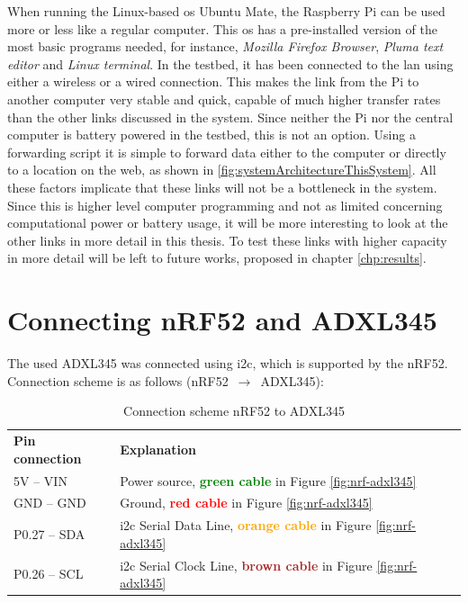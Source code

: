 \noindent When running the Linux-based \gls{os} Ubuntu Mate, the \gls{Raspberry Pi} can be used more or less like a regular computer. This \gls{os} has a pre-installed version of the most basic programs needed, for instance, \textit{Mozilla Firefox Browser}, \textit{Pluma text editor} and \textit{Linux terminal}. In the testbed, it has been connected to the \gls{lan} using either a wireless or a wired connection. This makes the link from the Pi to another computer very stable and quick, capable of much higher transfer rates than the other links discussed in the system. Since neither the Pi nor the central computer is battery powered in the testbed, this is not an option. Using a forwarding script it is simple to forward data either to the computer or directly to a location on the web, as shown in \ref{fig:systemArchitectureThisSystem}. All these factors implicate that these links will not be a bottleneck in the system. Since this is higher level computer programming and not as limited concerning computational power or battery usage, it will be more interesting to look at the other links in more detail in this thesis. To test these links with higher capacity in more detail will be left to future works, proposed in chapter \ref{chp:results}. 


\section{Connecting nRF52 and ADXL345}

\noindent The used \gls{ADXL345} was connected using \gls{i2c}, which is supported by the \gls{nRF52}. Connection scheme is as follows (\gls{nRF52} $\,\to\,$ \gls{ADXL345}): 

\begin{table}[H]
\centering
\caption{Connection scheme nRF52 to ADXL345}
\label{nRF52ADXL345connection}
\begin{tabular}{ll}
\textbf{Pin connection} & \textbf{Explanation}                                                                                            \\
5V -- VIN               & Power source, \textbf{\textcolor{green}{green cable}} in Figure \ref{fig:nrf-adxl345}                   \\
GND -- GND              & Ground, \textbf{\textcolor{red}{red cable}} in Figure \ref{fig:nrf-adxl345}                             \\
P0.27 -- SDA            & \gls{i2c} Serial Data Line, \textbf{\textcolor{orange}{orange cable}} in Figure \ref{fig:nrf-adxl345} \\
P0.26 -- SCL            & \gls{i2c} Serial Clock Line, \textbf{\textcolor{brown}{brown cable}} in Figure \ref{fig:nrf-adxl345} 
\end{tabular}
\end{table}

